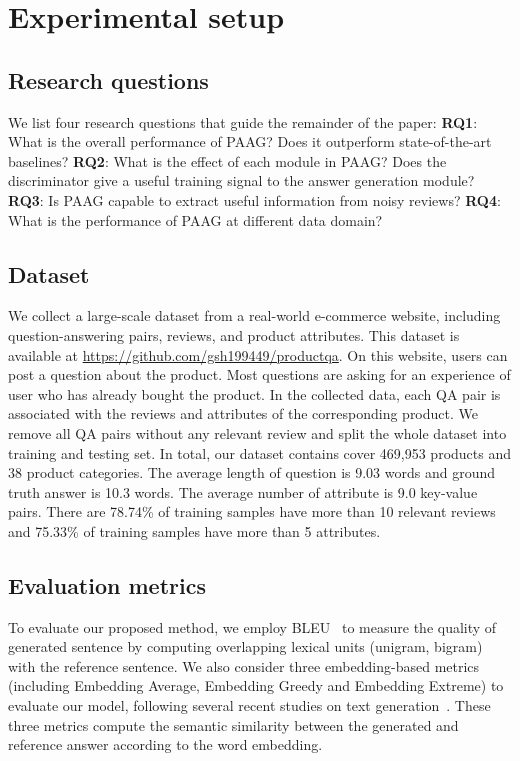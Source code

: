 \section{Experimental setup}

\subsection{Research questions}\label{sec:research-question}

We list four research questions that guide the remainder of the paper: 
\textbf{RQ1}: What is the overall performance of PAAG? Does it outperform state-of-the-art baselines?
\textbf{RQ2}: What is the effect of each module in PAAG? Does the discriminator give a useful training signal to the answer generation module?
\textbf{RQ3}: Is PAAG capable to extract useful information from noisy reviews?
\textbf{RQ4}: What is the performance of PAAG at different data domain? 

\subsection{Dataset}
We collect a large-scale dataset from a real-world e-commerce website, including question-answering pairs, reviews, and product attributes.
This dataset is available at \url{https://github.com/gsh199449/productqa}.
On this website, users can post a question about the product.
Most questions are asking for an experience of user who has already bought the product.
In the collected data, each QA pair is associated with the reviews and attributes of the corresponding product.
We remove all QA pairs without any relevant review and split the whole dataset into training and testing set.
In total, our dataset contains cover 469,953 products and 38 product categories.
The average length of question is 9.03 words and ground truth answer is 10.3 words.
The average number of attribute is 9.0 key-value pairs.
There are 78.74\% of training samples have more than 10 relevant reviews and 75.33\% of training samples have more than 5 attributes.

\subsection{Evaluation metrics}

To evaluate our proposed method, we employ BLEU~\cite{Papineni2002BleuAM} to measure the quality of generated sentence by computing overlapping lexical units (\eg unigram, bigram) with the reference sentence.
We also consider three embedding-based metrics~\cite{forgues2014bootstrapping} (including Embedding Average, Embedding Greedy and Embedding Extreme) to evaluate our model, following several recent studies on text generation~\cite{Serban2017AHL, Xu2017NeuralRG, Tao2018Get}. 
These three metrics compute the semantic similarity between the generated and reference answer according to the word embedding.

